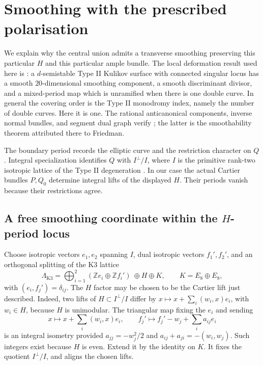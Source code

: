 \documentclass[11pt]{article}
\theoremstyle{definition}
\theoremstyle{remark}
\newcommand{\Z}{\mathbb Z}
\begin{document}
\section{Smoothing with the prescribed polarisation}\label{sec:smoothing}

We explain why the central union admits a transverse smoothing preserving this
particular $H$ and this particular ample bundle. The local deformation result
used here is \cite[\S7A, Theorem~7.1]{AE}: a $d$-semistable Type II Kulikov
surface with connected singular locus has a smooth $20$-dimensional smoothing
component, a smooth discriminant divisor, and a mixed-period map which is
unramified when there is one double curve. In general the covering order is the
Type II monodromy index, namely the number of double curves. Here it is one. The
rational anticanonical components, inverse normal bundles, and segment dual
graph verify \cite[Definition~3.4 and Theorem~3.5]{AE}; the latter is the
smoothability theorem attributed there to Friedman.


The boundary period records the elliptic curve and the restriction character on $Q$. Integral specialization identifies $Q$ with $I^\perp/I$, where $I$ is the primitive rank-two isotropic lattice of the Type II degeneration \cite[Proposition~3.20 and \S4]{AE}. In our case the actual Cartier bundles $P,Q_0$ determine integral lifts of the displayed $H$. Their periods vanish because their restrictions agree.

\subsection{A free smoothing coordinate within the \texorpdfstring{$H$}{H}-period locus}
Choose isotropic vectors $e_1,e_2$ spanning $I$, dual isotropic vectors $f_1',f_2'$, and an orthogonal splitting of the K3 lattice
\[
\Lambda_{\mathrm{K3}}=\bigoplus_{i=1}^2(\Z e_i\oplus\Z f_i')\ \oplus H\oplus K,
\qquad K=E_8\oplus E_8,
\]
with $(e_i,f_j')=\delta_{ij}$. The $H$ factor may be chosen to be the Cartier lift just described. Indeed, two lifts of $H\subset I^\perp/I$ differ by
$x\mapsto x+\sum_i(w_i,x)e_i$, with $w_i\in H$, because $H$ is unimodular. The triangular map fixing the $e_i$ and sending
\[
x\longmapsto x+\sum_i(w_i,x)e_i,\qquad
f_j'\longmapsto f_j'-w_j+\sum_i a_{ij}e_i
\]
is an integral isometry provided
$a_{jj}=-w_j^2/2$ and $a_{ij}+a_{ji}=-(w_i,w_j)$. Such integers exist because $H$ is even. Extend it by the identity on $K$. It fixes the quotient $I^\perp/I$, and aligns the chosen lifts.
\end{document}
